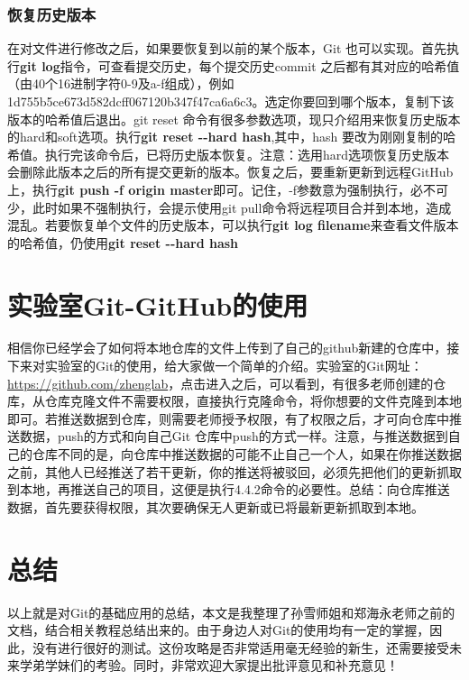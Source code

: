 \documentclass{article}
\begin{document}
\subsubsection{恢复历史版本}

在对文件进行修改之后，如果要恢复到以前的某个版本，Git 也可以实现。首先执行\textbf{git log}指令，可查看提交历史，每个提交历史commit 之后都有其对应的哈希值（由40个16进制字符0-9及a-f组成），例如1d755b5ce673d582dcff067120b347f47ca6a6c3。选定你要回到哪个版本，复制下该版本的哈希值后退出。git reset 命令有很多参数选项，现只介绍用来恢复历史版本的hard和soft选项。执行\textbf{git reset {-}{-}hard hash},其中，hash 要改为刚刚复制的哈希值。执行完该命令后，已将历史版本恢复。注意：选用hard选项恢复历史版本会删除此版本之后的所有提交更新的版本。恢复之后，要重新更新到远程GitHub上，执行\textbf{git push -f origin master}即可。记住，-f参数意为强制执行，必不可少，此时如果不强制执行，会提示使用git pull命令将远程项目合并到本地，造成混乱。若要恢复单个文件的历史版本，可以执行\textbf{git log filename}来查看文件版本的哈希值，仍使用\textbf{git reset {-}{-}hard hash}

\section{实验室Git-GitHub的使用}
相信你已经学会了如何将本地仓库的文件上传到了自己的github新建的仓库中，接下来对实验室的Git的使用，给大家做一个简单的介绍。实验室的Git网址：\url{https://github.com/zhenglab}，点击进入之后，可以看到，有很多老师创建的仓库，从仓库克隆文件不需要权限，直接执行克隆命令，将你想要的文件克隆到本地即可。若推送数据到仓库，则需要老师授予权限，有了权限之后，才可向仓库中推送数据，push的方式和向自己Git 仓库中push的方式一样。注意，与推送数据到自己的仓库不同的是，向仓库中推送数据的可能不止自己一个人，如果在你推送数据之前，其他人已经推送了若干更新，你的推送将被驳回，必须先把他们的更新抓取到本地，再推送自己的项目，这便是执行4.4.2命令的必要性。总结：向仓库推送数据，首先要获得权限，其次要确保无人更新或已将最新更新抓取到本地。

\section{总结}

以上就是对Git的基础应用的总结，本文是我整理了孙雪师姐和郑海永老师之前的文档，结合相关教程总结出来的。由于身边人对Git的使用均有一定的掌握，因此，没有进行很好的测试。这份攻略是否非常适用毫无经验的新生，还需要接受未来学弟学妹们的考验。同时，非常欢迎大家提出批评意见和补充意见！
\end{document}
